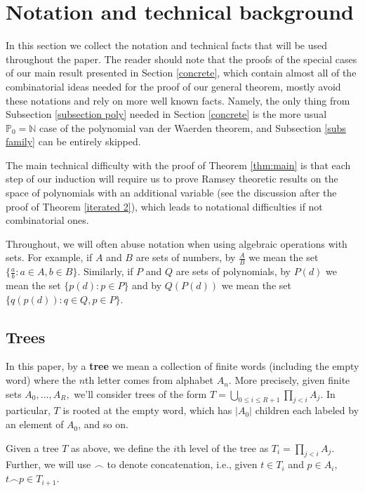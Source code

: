 \documentclass[tocmacros]{daj}
\begin{document}
\section{Notation and technical background}

In this section we collect the notation and technical facts that will be used throughout the paper.  The reader should note that the proofs of the special cases of our main result presented in Section \ref{concrete}, which contain almost all of the combinatorial ideas needed for the proof of our general theorem, mostly avoid these notations and rely on more well known facts.  Namely, the only thing from Subsection \ref{subsection poly} needed in Section \ref{concrete} is the more usual $\mathbb{P}_0=\mathbb{N}$ case of the polynomial van der Waerden theorem, and Subsection \ref{subs family} can be entirely skipped.

The main technical difficulty with the proof of Theorem \ref{thm:main} is that each step of our induction will require us to prove Ramsey theoretic results on the space of polynomials with an additional variable (see the discussion after the proof of Theorem \ref{iterated 2}), which leads to notational difficulties if not combinatorial ones.  

Throughout, we will often abuse notation when using algebraic operations with sets.  For example, if $A$ and $B$ are sets of numbers, by $\frac{A}{B}$ we mean the set $\{\frac{a}{b}:a\in A, b\in B\}.$  Similarly, if $P$ and $Q$ are sets of polynomials, by $P(d)$ we mean the set $\{p(d):p\in P\}$ and by $Q(P(d))$ we mean the set $\{q(p(d)): q\in Q,p\in P\}.$

\subsection{Trees}

In this paper, by a \textbf{tree} we mean a collection of finite words (including the empty word) where the $n$th letter comes from alphabet $A_n.$  More precisely, given finite sets $A_0,...,A_R,$ we'll consider trees of the form $T=\bigcup_{0\leq i\leq R+1}\prod_{j<i} A_j. $  In particular, $T$ is rooted at the empty word, which has $|A_0|$ children each labeled by an element of $A_0$, and so on.

Given a tree $T$ as above, we define the $i$th level of the tree as $T_i=\prod_{j<i} A_j.$  Further, we will use $\smallfrown$ to denote concatenation, i.e., given $t\in T_i$ and $p\in A_i,$ $t\smallfrown p\in T_{i+1}.$
\end{document}
